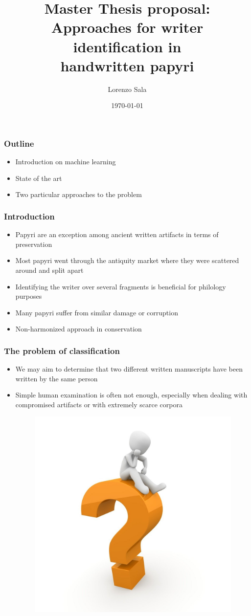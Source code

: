 \documentclass{beamer}
\title[Writer identification task]{Master Thesis proposal:\\Approaches for writer identification in \\
handwritten papyri}
\author{Lorenzo Sala}
\date{\today}
\institute{Stochastics and Data Science}
\begin{document}
\begin{frame}[plain]
    \maketitle
\end{frame}
\begin{frame}
	\frametitle{Outline}
	\begin{itemize}
		\item Introduction on machine learning
		\item State of the art
		\item Two particular approaches to the problem
	\end{itemize}
\end{frame}
\begin{frame}[c]
	\frametitle{Introduction}
	\begin{itemize}
		\item Papyri are an exception among ancient written artifacts in terms of preservation
		\item Most papyri went through the antiquity market where they were scattered around and split apart
		\item Identifying the writer over several fragments is beneficial for philology purposes
		\item Many papyri suffer from similar damage or corruption
		\item Non-harmonized approach in conservation
	\end{itemize}
\end{frame}
\begin{frame}
	\frametitle{The problem of classification}
	\begin{itemize}
		\item We may aim to determine that two different written manuscripts have been written by the same person
		\item Simple human examination is often not enough, especially when dealing with compromised artifacts or with extremely scarce corpora\begin{figure}[h]
			\centering
			\includegraphics[width=0.4\linewidth]{img/question}
			\label{fig:question}
		\end{figure}	
	\end{itemize}
\end{frame}
\end{document}
